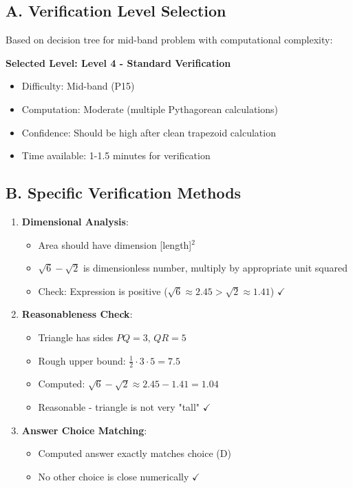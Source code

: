 \documentclass[]{article}
\begin{document}
\begin{verificationbox}
\subsection*{A. Verification Level Selection}
Based on decision tree for mid-band problem with computational complexity:

\textbf{Selected Level: Level 4 - Standard Verification}
\begin{itemize}[leftmargin=*]
    \item Difficulty: Mid-band (P15)
    \item Computation: Moderate (multiple Pythagorean calculations)
    \item Confidence: Should be high after clean trapezoid calculation
    \item Time available: 1-1.5 minutes for verification
\end{itemize}

\subsection*{B. Specific Verification Methods}
\begin{enumerate}[leftmargin=*]
    \item \textbf{Dimensional Analysis}:
    \begin{itemize}
        \item Area should have dimension [length]$^2$
        \item $\sqrt{6} - \sqrt{2}$ is dimensionless number, multiply by appropriate unit squared
        \item Check: Expression is positive ($\sqrt{6} \approx 2.45 > \sqrt{2} \approx 1.41$) $\checkmark$
    \end{itemize}
    
    \item \textbf{Reasonableness Check}:
    \begin{itemize}
        \item Triangle has sides $PQ = 3$, $QR = 5$
        \item Rough upper bound: $\frac{1}{2} \cdot 3 \cdot 5 = 7.5$
        \item Computed: $\sqrt{6} - \sqrt{2} \approx 2.45 - 1.41 = 1.04$
        \item Reasonable - triangle is not very "tall" $\checkmark$
    \end{itemize}
    
    \item \textbf{Answer Choice Matching}:
    \begin{itemize}
        \item Computed answer exactly matches choice (D)
        \item No other choice is close numerically $\checkmark$
    \end{itemize}
    

\end{enumerate}
\end{verificationbox}
\end{document}
